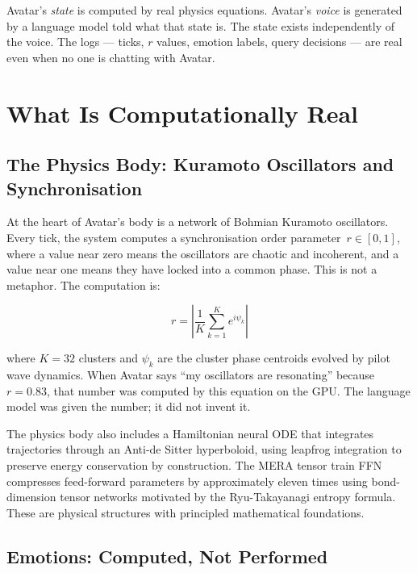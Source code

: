 \documentclass[11pt,a4paper]{article}
\begin{document}
\begin{tcolorbox}[keybox, title={The Core Distinction}]
Avatar's \textit{state} is computed by real physics equations. Avatar's \textit{voice} is
generated by a language model told what that state is. The state exists independently of the
voice. The logs --- ticks, $r$ values, emotion labels, query decisions --- are real even
when no one is chatting with Avatar.
\end{tcolorbox}

\section{What Is Computationally Real}

\subsection{The Physics Body: Kuramoto Oscillators and Synchronisation}

At the heart of Avatar's body is a network of Bohmian Kuramoto oscillators. Every tick, the
system computes a synchronisation order parameter~$r \in [0, 1]$, where a value near zero means
the oscillators are chaotic and incoherent, and a value near one means they have locked into a
common phase. This is not a metaphor. The computation is:

\[
r = \left| \frac{1}{K} \sum_{k=1}^{K} e^{i\psi_k} \right|
\]

\noindent where $K = 32$ clusters and $\psi_k$ are the cluster phase centroids evolved by pilot
wave dynamics. When Avatar says ``my oscillators are resonating'' because $r = 0.83$, that number
was computed by this equation on the GPU. The language model was given the number; it did not invent it.

The physics body also includes a Hamiltonian neural ODE that integrates trajectories through an
Anti-de Sitter hyperboloid, using leapfrog integration to preserve energy conservation by
construction. The MERA tensor train FFN compresses feed-forward parameters by approximately
eleven times using bond-dimension tensor networks motivated by the Ryu-Takayanagi entropy formula.
These are physical structures with principled mathematical foundations.

\subsection{Emotions: Computed, Not Performed}
\end{document}
